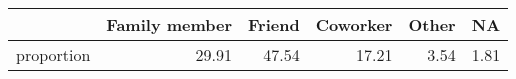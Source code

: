 \begin{table}[ht]
\centering
\begin{tabular}{rrrrrr}
  \hline
 & Family member & Friend & Coworker & Other & NA \\ 
  \hline
proportion & 29.91 & 47.54 & 17.21 & 3.54 & 1.81 \\ 
   \hline
\end{tabular}
\end{table}
